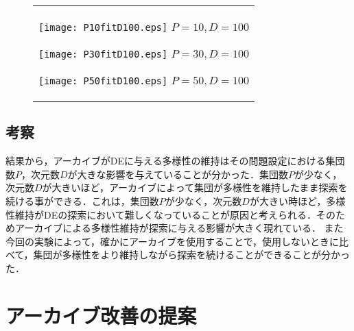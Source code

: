 \documentclass[a4paper,11pt,oneside,openany]{jsbook}
\begin{document}
\begin{figure}[htbp]
  \begin{center}
    \begin{tabular}{c}

      \begin{minipage}{0.33\hsize}
        \begin{center}
          \texttt{[image: P10fitD100.eps]}
          \hspace{1.2cm} $P=10, D=100$
        \end{center}
      \end{minipage}

      \begin{minipage}{0.33\hsize}
        \begin{center}
          \texttt{[image: P30fitD100.eps]}
          \hspace{1.2cm} $P=30, D=100$
        \end{center}
      \end{minipage}

      \begin{minipage}{0.33\hsize}
        \begin{center}
          \texttt{[image: P50fitD100.eps]}
          \hspace{1.2cm} $P=50, D=100$
        \end{center}
      \end{minipage}
    \end{tabular}
    \label{fig:lena}
  \end{center}
\end{figure}

\section{考察}
結果から，アーカイブがDEに与える多様性の維持はその問題設定における集団数$P$，次元数$D$が大きな影響を与えていることが分かった．集団数$P$が少なく，次元数$D$が大きいほど，アーカイブによって集団が多様性を維持したまま探索を続ける事ができる．これは，集団数$P$が少なく，次元数$D$が大きい時ほど，多様性維持がDEの探索において難しくなっていることが原因と考えられる．そのためアーカイブによる多様性維持が探索に与える影響が大きく現れている．
また今回の実験によって，確かにアーカイブを使用することで，使用しないときに比べて，集団が多様性をより維持しながら探索を続けることができることが分かった．

\chapter{アーカイブ改善の提案}
\end{document}
